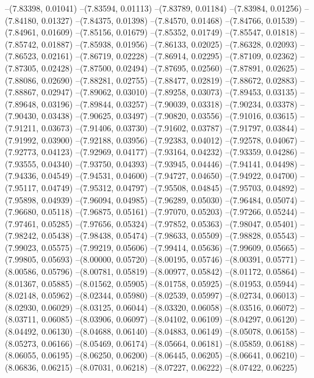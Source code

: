 --(7.83398, 0.01041)
--(7.83594, 0.01113)
--(7.83789, 0.01184)
--(7.83984, 0.01256)
--(7.84180, 0.01327)
--(7.84375, 0.01398)
--(7.84570, 0.01468)
--(7.84766, 0.01539)
--(7.84961, 0.01609)
--(7.85156, 0.01679)
--(7.85352, 0.01749)
--(7.85547, 0.01818)
--(7.85742, 0.01887)
--(7.85938, 0.01956)
--(7.86133, 0.02025)
--(7.86328, 0.02093)
--(7.86523, 0.02161)
--(7.86719, 0.02228)
--(7.86914, 0.02295)
--(7.87109, 0.02362)
--(7.87305, 0.02428)
--(7.87500, 0.02494)
--(7.87695, 0.02560)
--(7.87891, 0.02625)
--(7.88086, 0.02690)
--(7.88281, 0.02755)
--(7.88477, 0.02819)
--(7.88672, 0.02883)
--(7.88867, 0.02947)
--(7.89062, 0.03010)
--(7.89258, 0.03073)
--(7.89453, 0.03135)
--(7.89648, 0.03196)
--(7.89844, 0.03257)
--(7.90039, 0.03318)
--(7.90234, 0.03378)
--(7.90430, 0.03438)
--(7.90625, 0.03497)
--(7.90820, 0.03556)
--(7.91016, 0.03615)
--(7.91211, 0.03673)
--(7.91406, 0.03730)
--(7.91602, 0.03787)
--(7.91797, 0.03844)
--(7.91992, 0.03900)
--(7.92188, 0.03956)
--(7.92383, 0.04012)
--(7.92578, 0.04067)
--(7.92773, 0.04123)
--(7.92969, 0.04177)
--(7.93164, 0.04232)
--(7.93359, 0.04286)
--(7.93555, 0.04340)
--(7.93750, 0.04393)
--(7.93945, 0.04446)
--(7.94141, 0.04498)
--(7.94336, 0.04549)
--(7.94531, 0.04600)
--(7.94727, 0.04650)
--(7.94922, 0.04700)
--(7.95117, 0.04749)
--(7.95312, 0.04797)
--(7.95508, 0.04845)
--(7.95703, 0.04892)
--(7.95898, 0.04939)
--(7.96094, 0.04985)
--(7.96289, 0.05030)
--(7.96484, 0.05074)
--(7.96680, 0.05118)
--(7.96875, 0.05161)
--(7.97070, 0.05203)
--(7.97266, 0.05244)
--(7.97461, 0.05285)
--(7.97656, 0.05324)
--(7.97852, 0.05363)
--(7.98047, 0.05401)
--(7.98242, 0.05438)
--(7.98438, 0.05474)
--(7.98633, 0.05509)
--(7.98828, 0.05543)
--(7.99023, 0.05575)
--(7.99219, 0.05606)
--(7.99414, 0.05636)
--(7.99609, 0.05665)
--(7.99805, 0.05693)
--(8.00000, 0.05720)
--(8.00195, 0.05746)
--(8.00391, 0.05771)
--(8.00586, 0.05796)
--(8.00781, 0.05819)
--(8.00977, 0.05842)
--(8.01172, 0.05864)
--(8.01367, 0.05885)
--(8.01562, 0.05905)
--(8.01758, 0.05925)
--(8.01953, 0.05944)
--(8.02148, 0.05962)
--(8.02344, 0.05980)
--(8.02539, 0.05997)
--(8.02734, 0.06013)
--(8.02930, 0.06029)
--(8.03125, 0.06044)
--(8.03320, 0.06058)
--(8.03516, 0.06072)
--(8.03711, 0.06085)
--(8.03906, 0.06097)
--(8.04102, 0.06109)
--(8.04297, 0.06120)
--(8.04492, 0.06130)
--(8.04688, 0.06140)
--(8.04883, 0.06149)
--(8.05078, 0.06158)
--(8.05273, 0.06166)
--(8.05469, 0.06174)
--(8.05664, 0.06181)
--(8.05859, 0.06188)
--(8.06055, 0.06195)
--(8.06250, 0.06200)
--(8.06445, 0.06205)
--(8.06641, 0.06210)
--(8.06836, 0.06215)
--(8.07031, 0.06218)
--(8.07227, 0.06222)
--(8.07422, 0.06225)
